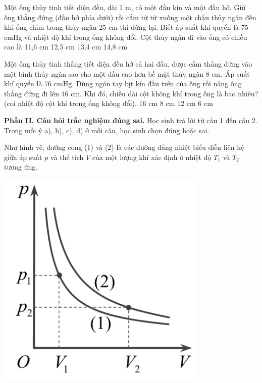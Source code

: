 \documentclass[12pt,a4paper]{article}
\begin{document}
\begin{multicols}{2}
	\begin{ex}
		Một ống thủy tinh tiết diện đều, dài 1 m, có một đầu kín và một đầu hở. Giữ ống thẳng đứng (đầu hở phía dưới) rồi cắm từ từ xuống một chậu thủy ngân đến khi ống chìm trong thủy ngân 25 cm thì dừng lại. Biết áp suất khí quyển là 75 cmHg và nhiệt độ khí trong ống không đổi. Cột thủy ngân đi vào ống có chiều cao là
		\choice
		{11,6 cm}
		{12,5 cm}
		{13,4 cm}
		{14,8 cm}
	\end{ex}
	
	\begin{ex}
		Một ống thủy tinh thẳng tiết diện đều hở cả hai đầu, được cắm thẳng đứng vào một bình thủy ngân sao cho một đầu cao hơn bề mặt thủy ngân 8 cm. Áp suất khí quyển là 76 cmHg. Dùng ngón tay bịt kín đầu trên của ống rồi nâng ống thẳng đứng đi lên 46 cm. Khi đó, chiều dài cột không khí trong ống là bao nhiêu? (coi nhiệt độ cột khí trong ống không đổi).
		\choice
		{16 cm}
		{8 cm}
		{12 cm}
		{6 cm}
	\end{ex}
\end{multicols}

\textbf{Phần II. Câu hỏi trắc nghiệm đúng sai.} Học sinh trả lời từ câu 1 đến câu 2. Trong mỗi ý a), b), c), d) ở mỗi câu, học sinh chọn đúng hoặc sai.
\setcounter{ex}{0}
\begin{ex}
\begin{minipage}{5cm}
	Như hình vẽ, đường cong (1) và (2) là các đường đẳng nhiệt biểu diễn liên hệ giữa áp suất $p$ và thể tích $V$ của một lượng khí xác định ở nhiệt độ $T_1$ và $T_2$ tương ứng.
\end{minipage}
\hspace{3cm}
\begin{minipage}{5cm}
	\begin{center}
		\includegraphics[scale=0.4]{img/9.png}
	\end{center}
\end{minipage}\\
\end{ex}
\end{document}
